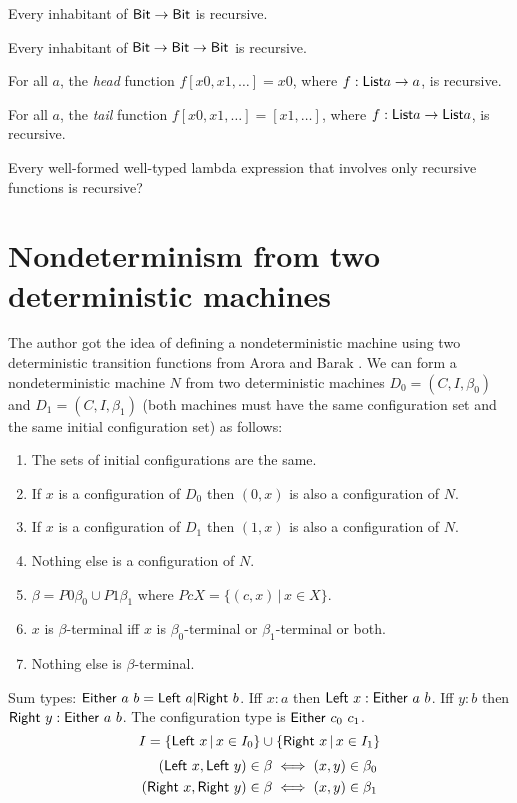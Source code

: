 Every inhabitant of $\textsf{Bit} \to \textsf{Bit}$ is recursive.

Every inhabitant of $\textsf{Bit} \to \textsf{Bit} \to \textsf{Bit}$ is recursive.

For all $a$, the \emph{head} function $f [x 0, x 1, \ldots] = x 0$,
where $f : \textsf{List}{a} \to a$, is recursive.

For all $a$, the \emph{tail} function $f [x 0, x 1, \ldots] = [x 1, \ldots]$,
where $f : \textsf{List}{a} \to \textsf{List}{a}$, is recursive.

Every well-formed well-typed lambda expression
that involves only recursive functions is recursive?

\section{Nondeterminism from two deterministic machines}

The author got the idea of defining a nondeterministic machine
using two deterministic transition functions
from Arora and Barak \cite[p.~40]{Arora2009}.
We can form a nondeterministic machine $N$
from two deterministic machines $D_0 = (C,I,\beta_0)$ and $D_1 = (C,I,\beta_1)$
(both machines must have the same configuration set and the same initial configuration set)
as follows:
\begin{enumerate}
    \item The sets of initial configurations are the same.
    \item If $x$ is a configuration of $D_0$ then $(0,x)$ is also a configuration of $N$.
    \item If $x$ is a configuration of $D_1$ then $(1,x)$ is also a configuration of $N$.
    \item Nothing else is a configuration of $N$.
    \item $\beta = P 0 \beta_0 \cup P 1 \beta_1$ where $P c X = \{ (c,x) \,|\, x \in X \}$.
    \item $x$ is $\beta$-terminal iff $x$ is $\beta_0$-terminal or $\beta_1$-terminal or both.
    \item Nothing else is $\beta$-terminal.
\end{enumerate}

Sum types: $\mathsf{Either}~a~b = \mathsf{Left}~a | \mathsf{Right}~b$.
Iff $x : a$ then $\mathsf{Left}~x : \mathsf{Either}~a~b$.
Iff $y : b$ then $\mathsf{Right}~y : \mathsf{Either}~a~b$.
The configuration type is $\mathsf{Either}~c_0~c_1$.
\[
    I =
    \{ \mathsf{Left}~x \,|\, x \in I_0 \}
    \cup
    \{ \mathsf{Right}~x \,|\, x \in I_1 \}
\]
\begin{align*}
    (\mathsf{Left}~x, \mathsf{Left}~y) \in \beta \iff (x,y) \in \beta_0
    \\
    (\mathsf{Right}~x, \mathsf{Right}~y) \in \beta \iff (x,y) \in \beta_1
\end{align*}

